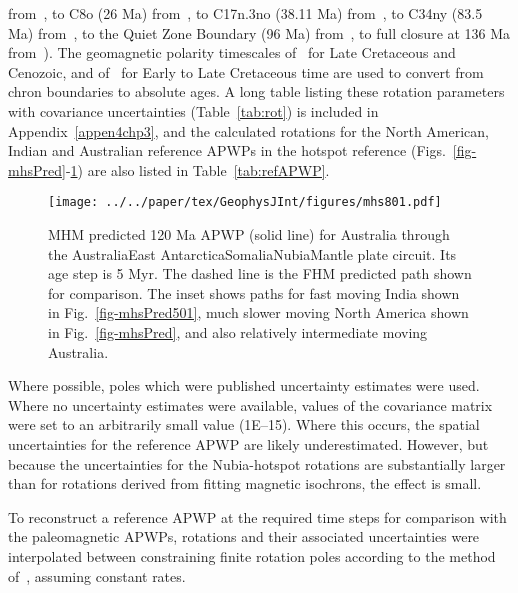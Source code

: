 from~\citet{C04}, to C8o (26 Ma) from~\citet{G18}, to C17n.3no (38.11 Ma)
from~\citet{C04}, to C34ny (83.5 Ma) from~\citet{Wh13}, to the Quiet Zone
Boundary (96 Ma) from~\citet{W07}, to full closure at 136 Ma from~\citet{Wh13}).
The geomagnetic polarity timescales of~\citet{C95} for Late Cretaceous and
Cenozoic, and of~\citet{Gr94} for Early to Late Cretaceous time are used to
convert from chron boundaries to absolute ages. A long table listing these
rotation parameters with covariance uncertainties (Table~\ref{tab:rot}) is
included in Appendix~\ref{appen4chp3}, and the calculated rotations for the
North American, Indian and Australian reference APWPs in the hotspot reference
(Figs.~\ref{fig-mhsPred}-\ref{fig-mhsPred801}) are also listed in
Table~\ref{tab:refAPWP}.

\begin{figure}[!ht]
  \centering
  \texttt{[image: ../../paper/tex/GeophysJInt/figures/mhs801.pdf]}
  \caption[120 Ma MHM vs FHM predicted APWP of Australia]{MHM
    predicted 120 Ma APWP (solid line) for Australia through the
    Australia\textendash{}East
    Antarctica\textendash{}Somalia\textendash{}Nubia\textendash{}Mantle plate
    circuit. Its age step is 5 Myr. The dashed line is the FHM predicted path
    shown for comparison. The inset shows paths for fast moving India shown in
    Fig.~\ref{fig-mhsPred501}, much slower moving North America shown in
    Fig.~\ref{fig-mhsPred}, and also relatively intermediate moving
    Australia.}\label{fig-mhsPred801}
\end{figure}

Where possible, poles which were published uncertainty estimates were used.
Where no uncertainty estimates were available, values of the covariance matrix
were set to an arbitrarily small value (1E–15). Where this occurs, the spatial
uncertainties for the reference APWP are likely underestimated. However, but
because the uncertainties for the Nubia-hotspot rotations are substantially
larger than for rotations derived from fitting magnetic isochrons, the effect is
small.

To reconstruct a reference APWP at the required time steps for comparison with
the paleomagnetic APWPs, rotations and their associated uncertainties were
interpolated between constraining finite rotation poles according to the method
of~\citet{D08}, assuming constant rates.

